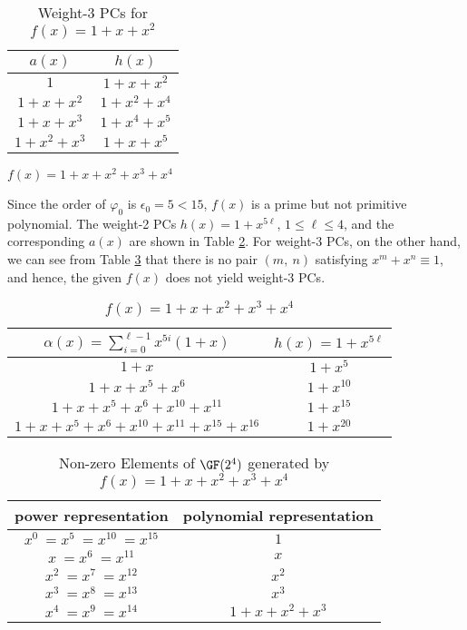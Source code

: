 \begin{example}
\begin{table}[htbp]
 \caption{Weight-3 PCs for $f(x)=1+x+x^2$}
\centering
 \begin{tabular}{c c} 
 \toprule
 $a(x)$ & $h(x)$\\ [0.5ex] 
 \midrule
$1$ & $1+x+x^2$\\ 
\hline
$1+x+x^2$ &  $1+x^2+x^4$\\
\hline
$1+x+x^3$ & $1+x^4+x^5$\\
\hline
$1+x^2+x^3$ & $1+x+x^5$ \\
\bottomrule
 \end{tabular}
 \label{novelTab8}
\end{table}

\label{ex-1}
\end{example}




\begin{example}
$f(x)=1+x+x^2+x^3+x^4$

Since the order of $\varphi_0$ is $\epsilon_0=5< 15$, $f(x)$ is a prime but not primitive polynomial. The weight-2 PCs $h(x)=1+x^{5\ell}$, $1 \leq \ell \leq 4$, and the corresponding $a(x)$ are shown in Table \ref{novelTab3}. For weight-3 PCs, on the other hand, we can see from Table \ref{novelTabWt3-2} that there is no pair $(m,~n)$ satisfying $x^m+x^n \equiv 1$, and hence, the given $f(x)$ does not yield weight-3 PCs.

\begin{table}[htbp]
\caption{$f(x)=1+x+x^2+x^3+x^4$}
\centering
\begin{tabular}{c c} 
 \toprule
 $\alpha(x)=\sum_{i=0}^{\ell-1} x^{5i}(1+x)$ & $h(x)=1+x^{5\ell}$  \\ [0.5ex] 
 \midrule
$1+x$ &$1+x^5$\\ 
\hline
$1+x+x^5+x^6$ &$1+x^{10}$  \\
\hline
$1+x+x^5+x^6+x^{10}+x^{11}$ & $1+x^{15}$ \\
\hline
$1+x+x^5+x^6+x^{10}+x^{11}+x^{15}+x^{16}$ &$1+x^{20}$  \\
\bottomrule
 \end{tabular}
 \label{novelTab3}
\end{table}

\begin{table}[htbp]
 \caption{Non-zero Elements of $\GF (2^4)$ generated by $f(x)=1+x+x^2+x^3+x^4$}
\centering
 \begin{tabular}{c c} 
 \toprule
 power representation & polynomial representation \\ [0.5ex] 
\midrule
$x^0~=x^5~=x^{10}~=x^{15}$ & $1$\\
\hline
$x~=x^6~=x^{11}$ & $x$\\
\hline
$x^2~=x^7~=x^{12}$ &  $x^2$\\
\hline
$x^3~=x^8~=x^{13}$ &  $x^3$\\
\hline
$x^4~=x^9~=x^{14}$ &  $1+x+x^2+x^3$\\
 \bottomrule
 \end{tabular}
 \label{novelTabWt3-2}
\end{table}
\label{ex-2}
\end{example}

